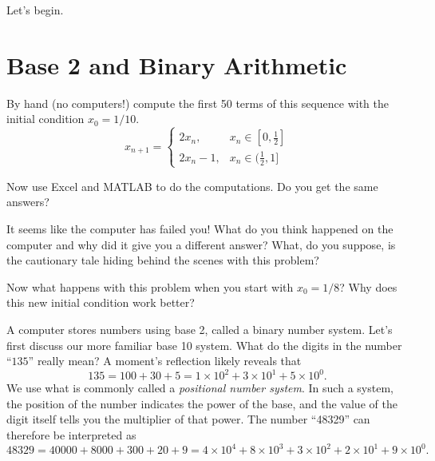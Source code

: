 \begin{center}
    Let's begin.
\end{center}
\section{Base 2 and Binary Arithmetic}
\begin{problem}\label{prob:base_10_faila}
    By hand (no computers!) compute the first 50 terms of this sequence with the initial condition $x_0 = 1/10$.
    \[ x_{n+1} = \left\{ \begin{array}{ll} 2x_n, & x_n \in [0,\frac{1}{2}] \\ 2x_n - 1, & x_n \in (\frac{1}{2},1] \end{array} \right. \]
    \end{problem}
\solution{
\[ x_n = \{1/10, 2/10, 4/10, 8/10, 6/10, 2/10, 4/10, 8/10, 6/10, \ldots \} \]
}

\begin{problem}\label{prob:base_10_failb}
Now use Excel and MATLAB to do the computations.  Do you get the same answers?  
\end{problem}

\begin{problem}\label{prob:base_10_failc}
It seems like the computer has failed you!   What do you think happened on the computer
and why did it give you a different answer?  What, do you suppose, is the cautionary tale hiding behind the scenes with this problem?
\end{problem}

\begin{problem}
    Now what happens with this problem when you start with $x_0 = 1/8$?  Why does this new
    initial condition work better?
\end{problem}

A computer stores numbers using base 2, called a binary number system.  Let's first
discuss our more familiar base 10 system.  What do the digits in the number ``$135$'' really
mean?  A moment's reflection likely reveals that 
\[ 135 = 100 + 30 + 5 =  1 \times 10^2 + 3 \times 10^1 + 5 \times 10^0. \]
We use what is commonly called a {\it positional number system}.  In such a system, the
position of the number indicates the power of the base, and the value of the digit itself
tells you the multiplier of that power.
The number ``48329'' can therefore be interpreted as
\[ 48329 = 40000 + 8000 + 300 + 20 + 9 = 4 \times 10^4 + 8 \times 10^3 + 3 \times 10^2 + 2
\times 10^1 + 9 \times 10^0. \]

